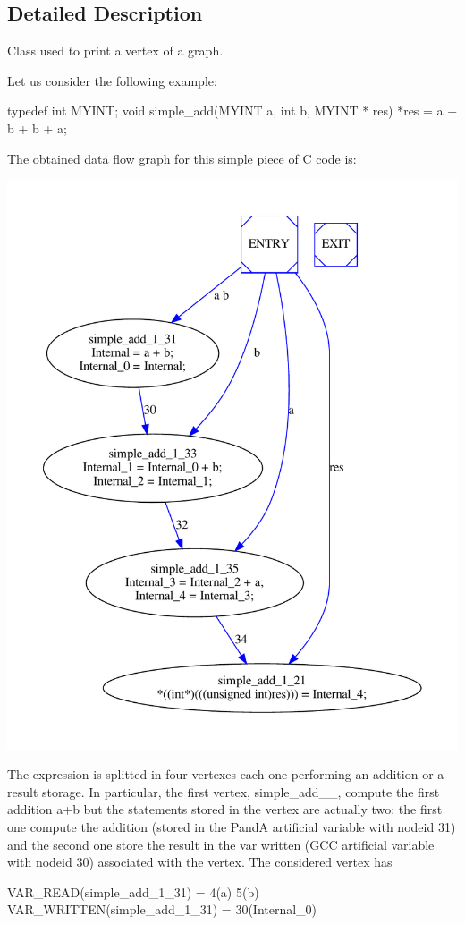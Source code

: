 \subsection{Detailed Description}
Class used to print a vertex of a graph. 

Let us consider the following example\+:

\begin{DoxyVerb}   typedef int MYINT;
   void simple_add(MYINT a, int b, MYINT * res)
   {
     *res = a + b + b + a;
   }\end{DoxyVerb}
 The obtained data flow graph for this simple piece of C code is\+: 
\begin{DoxyImageNoCaption}
  \mbox{\includegraphics[width=\textwidth,height=\textheight/2,keepaspectratio=true]{dot_inline_dotgraph_26}}
\end{DoxyImageNoCaption}
 The expression is splitted in four vertexes each one performing an addition or a result storage. In particular, the first vertex, simple\+\_\+add\+\_\+\_, compute the first addition a+b but the statements stored in the vertex are actually two\+: the first one compute the addition (stored in the PandA artificial variable with nodeid 31) and the second one store the result in the var written (G\+CC artificial variable with nodeid 30) associated with the vertex. The considered vertex has \begin{DoxyVerb}  VAR_READ(simple_add_1_31) = 4(a) 5(b)
  VAR_WRITTEN(simple_add_1_31) = 30(Internal_0)
\end{DoxyVerb}
